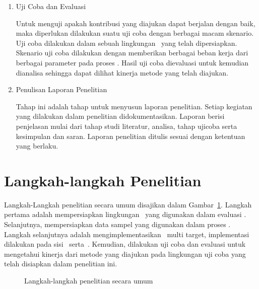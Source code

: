 \begin{enumerate}
  \item Uji Coba dan Evaluasi

    Untuk menguji apakah kontribusi yang diajukan dapat berjalan dengan baik,
    maka diperlukan dilakukan suatu uji coba dengan berbagai macam skenario. Uji
    coba dilakukan dalam sebuah lingkungan \testbed~yang telah dipersiapkan.
    Skenario uji coba dilakukan dengan memberikan berbagai beban kerja dari
    berbagai parameter pada proses \tracking. Hasil uji coba dievaluasi untuk
    kemudian dianalisa sehingga dapat dilihat kinerja metode yang telah
    diajukan.

  \item Penulisan Laporan Penelitian

    Tahap ini adalah tahap untuk menyusun laporan penelitian. Setiap kegiatan
    yang dilakukan dalam penelitian didokumentasikan. Laporan berisi penjelasan
    mulai dari tahap studi literatur, analisa, tahap ujicoba serta kesimpulan
    dan saran.  Laporan penelitian ditulis sesuai dengan ketentuan yang berlaku.

\end{enumerate}


\section{Langkah-langkah Penelitian}

Langkah-Langkah penelitian secara umum disajikan dalam Gambar~\ref{fig:langkah}.
Langkah pertama adalah mempersiapkan lingkungan \testbed~yang digunakan dalam
evaluasi \pubsub. Selanjutnya, mempersiapkan data sampel yang digunakan dalam
proses \tracking.  Langkah selanjutnya adalah mengimplementasikan
\tracking~multi target, implementasi dilakukan pada sisi \client~serta~\server.
Kemudian, dilakukan uji coba dan evaluasi untuk mengetahui kinerja dari metode
yang diajukan pada lingkungan uji coba yang telah disiapkan dalam penelitian
ini.

\begin{figure}
  \centering
\caption{Langkah-langkah penelitian secara umum}
\label{fig:langkah}
\end{figure}

